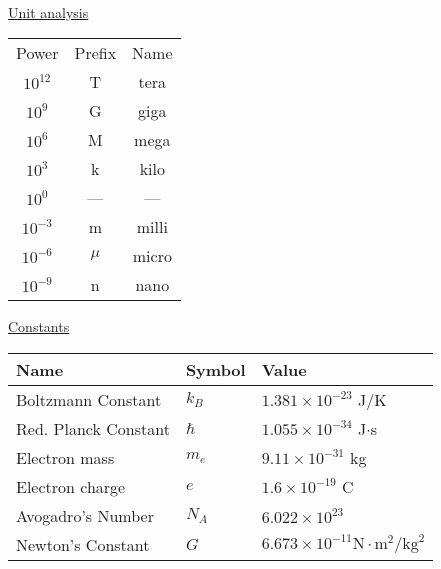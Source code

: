 \thispagestyle{empty}
\newcommand{\degrees}{$^\circ$}
\setlength{\parindent}{12pt}

\begin{center}
\\
\end{center}
\begin{multicols}{2}
\begin{minipage}{\columnwidth}
\centering\underline{Unit analysis}\\
\begin{tabular}{c c c}
Power & Prefix & Name\\
$10^{12}$ & T & tera\\
$10^9$ & G & giga\\
$10^6$ & M & mega\\
$10^3$ & k & kilo\\
$10^0$ & --- & ---\\
$10^{-3}$ & m & milli\\
$10^{-6}$ & $\mu$ & micro\\
$10^{-9}$ & n & nano
\end{tabular}
\end{minipage}

\vspace{7cm}
\begin{minipage}{\columnwidth}
\begin{center}\underline{Constants}\end{center}
\begin{tabular}{lll}
	Name&Symbol&Value\\ \hline
	Boltzmann Constant & $k_B$ & $1.381\times10^{-23}$ J/K\\
	Red. Planck Constant & $\hbar$ & $1.055\times10^{-34}$ J$\cdot$s\\
	Electron mass & $m_e$ & $9.11\times10^{-31}$ kg\\
	Electron charge & $e$ & $1.6\times 10^{-19}$ C\\
	Avogadro's Number &$N_A$& $6.022\times10^{23}$\\
	Newton's Constant &$G$ & $6.673\times10^{-11}\mathrm{N}\cdot\mathrm{m}^2/\mathrm{kg}^2$\\
\end{tabular}
\end{minipage}


\begin{minipage}{\columnwidth}
	

\end{minipage}
\end{multicols}
